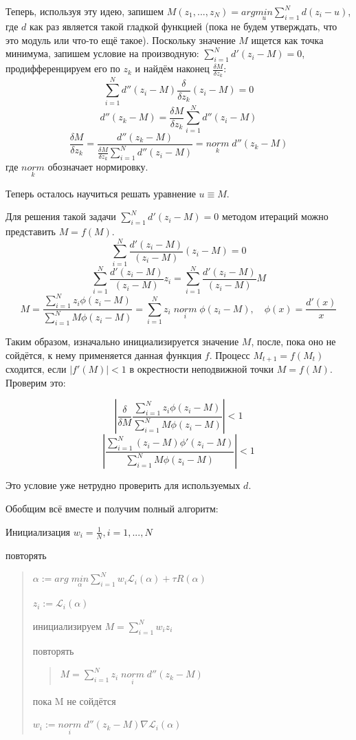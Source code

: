 Теперь, используя эту идею, запишем $M(z_1, ..., z_N) =  arg \underset{u}{min} \sum_{i=1}^N d(z_i - u)$, где $d$ как раз является такой гладкой функцией (пока не будем утверждать, что это модуль или что-то ещё такое). Поскольку значение $M$ ищется как точка минимума, запишем условие на производную: $\sum_{i=1}^N d'(z_i - M) = 0$, продифференцируем его по $z_k$ и найдём наконец $\frac{\delta M}{\delta z_k}$:
$$\sum_{i=1}^Nd''(z_i - M) \frac{\delta}{\delta z_k} (z_i - M) = 0$$
$$d''(z_k - M) = \frac{\delta M}{\delta z_k} \sum_{i=1}^Nd''(z_i - M)$$
$$\frac{\delta M}{\delta z_k} = \frac{d''(z_k - M)}{\frac{\delta M}{\delta z_k} \sum_{i=1}^Nd''(z_i - M)} = \underset{k}{norm} \; d''(z_k - M)$$
где $\underset{k}{norm}$ обозначает нормировку.

Теперь осталось научиться решать уравнение $u \equiv M$.

Для решения такой задачи $\sum_{i=1}^Nd'(z_i - M) = 0$ методом итераций можно представить $M = f(M)$.
$$\sum_{i=1}^N \frac{d'(z_i - M)}{(z_i - M)} (z_i - M) = 0$$
$$\sum_{i=1}^N \frac{d'(z_i - M)}{(z_i - M)} z_i = \sum_{i=1}^N \frac{d'(z_i - M)}{(z_i - M)} M$$
$$M = \frac{\sum_{i=1}^N z_i \phi(z_i - M)}{\sum_{i=1}^N M \phi(z_i - M)} = \sum_{i=1}^N z_i \; \underset{i}{norm} \; \phi(z_i - M), \quad \phi(x) = \frac{d'(x)}{x}$$

Таким образом, изначально инициализируется значение $M$, после, пока оно не сойдётся, к нему применяется данная функция $f$. Процесс $M_{t+1} = f(M_t)$ сходится, если $|f'(M)| < 1$ в окрестности неподвижной точки $M = f(M)$. Проверим это:

$$\left|\frac{\delta}{\delta M} \frac{\sum_{i=1}^N z_i \phi(z_i - M)}{\sum_{i=1}^N M \phi(z_i - M)}\right| < 1$$
$$\left|\frac{\sum_{i=1}^N (z_i - M) \phi'(z_i - M)}{\sum_{i=1}^N M \phi(z_i - M)}\right| < 1$$

Это условие уже нетрудно проверить для используемых $d$.

Обобщим всё вместе и получим полный алгоритм:

Инициализация $w_i = \frac{1}{N}, i = 1,...,N$

повторять
\begin{quote}
    $\alpha := arg \; \underset{\alpha}{min} \sum_{i=1}^N w_i \mathscr{L}_i(\alpha) + \tau R(\alpha)$\
    
    $z_i := \mathscr{L}_i(\alpha)$\
    
    инициализируем $M = \sum_{i=1}^N w_i z_i$\

    повторять\
    \begin{quote}
        $M = \sum_{i=1}^N z_i \; \underset{i}{norm} \; d''(z_k - M)$\
    \end{quote}
    
    пока M не сойдётся\
    
    $w_i := \underset{i}{norm} \; d''(z_k - M) \nabla \mathscr{L}_i(\alpha)$ \

\end{quote}

